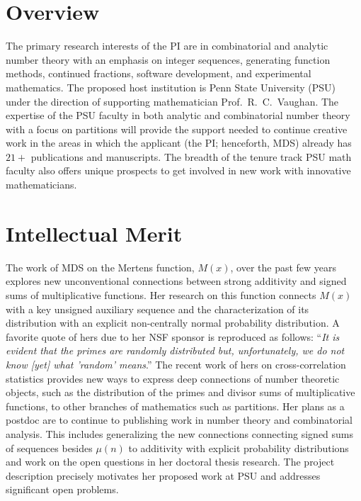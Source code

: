 \documentclass[10pt,reqno,letterpaper]{article}
\theoremstyle{plain}
\numberwithin{theorem}{section}
\theoremstyle{definition}
\begin{document}
\newcommand{\GRFPEssayTitle}{NSF Postdoctoral Fellowship Project Summary}

\section{Overview}

The primary research interests of the PI are in combinatorial and 
analytic number theory with an emphasis on 
integer sequences, generating function methods, continued fractions, 
software development, and experimental mathematics. 
The proposed host institution is Penn State University (PSU) under the direction of 
supporting mathematician Prof.~R.~C.~Vaughan. 
The expertise of the PSU faculty in both analytic and combinatorial number theory 
with a focus on partitions 
will provide the support needed to continue creative work in the areas in 
which the applicant (the PI; henceforth, MDS) already has $21+$ publications and manuscripts. 
The breadth of the tenure track PSU math faculty also offers unique 
prospects to get involved in new work with innovative mathematicians. 

\section{Intellectual Merit}

The work of MDS on the Mertens function, $M(x)$, over the past few years explores 
new unconventional connections between strong additivity and signed sums of 
multiplicative functions. Her research on this function connects $M(x)$ with a key 
unsigned auxiliary sequence and the characterization of its distribution with an 
explicit non-centrally normal probability distribution. A favorite quote of hers 
due to her NSF sponsor 
is reproduced as follows: 
``\emph{It is evident that the primes are randomly distributed but, 
      unfortunately, we do not know [yet] what 'random' means}.''
The recent work of hers on cross-correlation statistics provides new ways to express deep 
connections of number theoretic objects, such as the distribution of the primes and 
divisor sums of multiplicative functions, to other branches of mathematics such as partitions. 
Her plans as a postdoc are to continue to publishing work in number theory 
and combinatorial analysis. This includes generalizing the new connections connecting signed sums of 
sequences besides $\mu(n)$ 
to additivity with explicit probability distributions and 
work on the open questions in her doctoral thesis research. 
The project description precisely motivates her proposed work 
at PSU and addresses significant open problems. 
\end{document}
